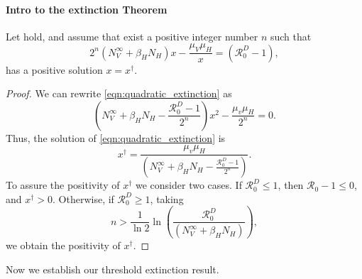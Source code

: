 \paragraph{Intro to the extinction Theorem}
\begin{lemma}
    \label{lem:quadratic_equation}
    Let  hold, 
    and assume that exist a positive integer number $n$
    such that 
    \begin{equation}\label{eqn:quadratic_extinction}
        2^n
        \left(
             N_V^{\infty} +
            \beta_H N_H
        \right) x
        - \frac{\mu_V \mu_H}{x}
        =
        \left(
            \mathcal{R}_0^D -1
        \right),
    \end{equation}
    has a positive solution $x=x^\dagger$. 
\end{lemma}
%
\begin{proof}
    We can rewrite \eqref{eqn:quadratic_extinction} as
    \begin{equation*}
        \left(
             N_V ^ {\infty} +
            \beta_H N_H            
            -\frac{\mathcal{R}_0 ^ D - 1}{2 ^ n}
        \right) x ^ 2
        - \frac{\mu_v \mu_H}{2 ^ n}
        = 0.
    \end{equation*}
    Thus, the solution of \eqref{eqn:quadratic_extinction} is
    \begin{equation}
        \label{eqn:quadratic_solution}
        x^{\dagger} = 
            \frac{\mu_v \mu_H}{
                \left(
                     N_V ^ {\infty} +
                    \beta_H N_H
                    -\frac{\mathcal{R}_0 ^ D - 1}{2 ^ n}
                \right)
            }.
    \end{equation}
    To assure the positivity of $x^{\dagger}$ we consider two cases.
    If $\mathcal{R}_0 ^ D \leq 1$, 
    then $\mathcal{R}_0 - 1 \leq 0$, and $x^{\dagger} >0$.
    Otherwise, if $\mathcal{R}_0 ^ D \geq 1$,
    taking 
    \begin{equation}
        \label{eqn:n_condition}
        n > \frac{1}{\ln 2} 
            \ln
            \left(
                \displaystyle
                \frac{\mathcal{R}_0 ^ D}{
                    \left(
                         N_V ^ {\infty} +
                        \beta_H N_H
                    \right)
                }    
            \right),
    \end{equation}
    we obtain the positivity of $x^{\dagger}$.
\end{proof}
%
%
%
Now we establish our threshold extinction result.
